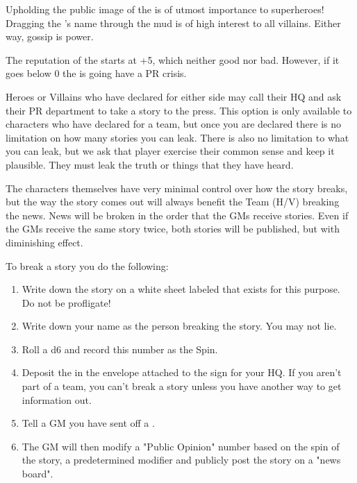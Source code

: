\documentclass[green]{LRSguildcamp1}
\begin{document}
\name{\gPR{}}

Upholding the public image of the \cHeroLeague{\intro} is of utmost importance to superheroes! 
Dragging the \cHeroLeague{}'s name through the mud is of high interest to all villains. Either way, gossip is power. 

The reputation of the \cHeroLeague{\intro} starts at +5, which neither good nor bad. However, if it goes below 0 the \cHeroLeague{} is going have a PR crisis. 

Heroes or Villains who have declared for either side may call their HQ and ask their PR department to take a story to the press. This option is only available to characters who have declared for a team, but once you are declared there is no limitation on how many stories you can leak. There is also no limitation to what you can leak, but we ask that player exercise their common sense and keep it plausible. They must leak the truth or things that they have heard. 

The characters themselves have very minimal control over how the story breaks, but the way the story comes out will always benefit the Team (H/V) breaking the news. News will be broken in the order that the GMs receive stories. Even if the GMs receive the same story twice, both stories will be published, but with diminishing effect. 

To break a story you do the following:
\begin{enumerate}

\item Write down the story on a white sheet labeled \wPressRelease{} that exists for this purpose. Do not be profligate! 

\item Write down your name as the person breaking the story. You may not lie. 

\item Roll a d6 and record this number as the Spin. 

\item Deposit the \wPressRelease{} in the envelope attached to the sign for your HQ. If you aren't part of a team, you can't break a story unless you have another way to get information out. 

\item Tell a GM you have sent off a \wPressRelease{}.

\item The GM will then modify a "Public Opinion" number based on the spin of the story, a predetermined modifier and publicly post the story on a "news board".
\end{enumerate}
\end{document}
